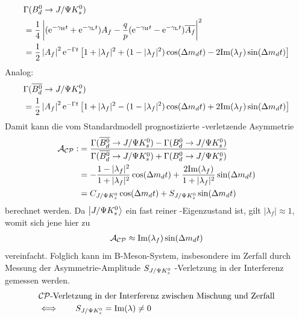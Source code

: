 \begin{align}
\nonumber &\Gamma (\text{$B_d^0$} \rightarrow J/\Psi K_s^0) \\
\nonumber &= \frac{1}{4}\left| (\mathrm{e}^{-\gamma_{\text{H}} t}+\mathrm{e}^{-\gamma_{\text{L}} t})A_f - \frac{q}{p}(\mathrm{e}^{-\gamma_{\text{H}} t}-\mathrm{e}^{-\gamma_{\text{L}} t})\overline{A_f}\right|^2 \\
&= \frac{1}{2} \left|A_f\right|^2\mathrm{e}^{-\Gamma t} \left[1+|\lambda_f|^2 + (1-|\lambda_f|^2)\cos(\Delta m_d t) - 2\mathrm{Im}(\lambda_f)\sin(\Delta m_d t)\right] \label{eq:bd}
\end{align}
Analog:
\begin{align}
\nonumber &\Gamma (\text{$\overline{B_d^0}$} \rightarrow J/\Psi K_s^0) \\
&= \frac{1}{2} \left|A_f\right|^2\mathrm{e}^{-\Gamma t} \left[1+|\lambda_f|^2 -(1-|\lambda_f|^2)\cos(\Delta m_d t) + 2\mathrm{Im}(\lambda_f)\sin(\Delta m_d t)\right] \label{eq:bdbar}
\end{align}
Damit kann die vom Standardmodell prognostizierte \CP-verletzende Asymmetrie 
\begin{align}
\mathcal{A}_{\text{$\mathcal{CP}$}} :&= \frac{\Gamma (\text{$\overline{B_d^0}$} \rightarrow J/\Psi K_s^0) - \Gamma (\text{$B_d^0$} \rightarrow J/\Psi K_s^0)}{\Gamma (\text{$\overline{B_d^0}$} \rightarrow J/\Psi K_s^0) + \Gamma (\text{$B_d^0$} \rightarrow J/\Psi K_s^0)} \label{eq:cp_asymm_def}\\
&= -\frac{1-|\lambda_f|^2}{1+|\lambda_f|^2}\cos(\Delta m_d t) + \frac{2\mathrm{Im}(\lambda_f)}{1+|\lambda_f|^2}\sin(\Delta m_d t) \\
&= C_{J/\Psi K_s^0} \cos(\Delta m_d t) + S_{J/\Psi K_s^0} \sin(\Delta m_d t) \label{eq:cp_asymm}
\end{align}
berechnet werden. Da $\Ket{J/\Psi K_s^0}$ ein fast reiner \CP-Eigenzustand ist, gilt $|\lambda_f| \approx 1$, womit sich jene hier zu
\begin{align}
\mathcal{A}_{\text{$\mathcal{CP}$}} \approx \mathrm{Im}(\lambda_f)\sin(\Delta m_d t)
\end{align}
vereinfacht. Folglich kann im B-Meson-System, insbesondere im Zerfall \linebreak\mbox{\Decaychannel} durch Messung der Asymmetrie-Amplitude $S_{J/\Psi K_s^0}$ \CP-Verletzung in der Interferenz gemessen werden.
\begin{align}
\nonumber &\text{$\mathcal{CP}$-Verletzung in der Interferenz zwischen Mischung und Zerfall} \\ &\Longleftrightarrow \qquad S_{J/\Psi K_s^0} = \mathrm{Im}(\lambda)\neq 0
\end{align}

